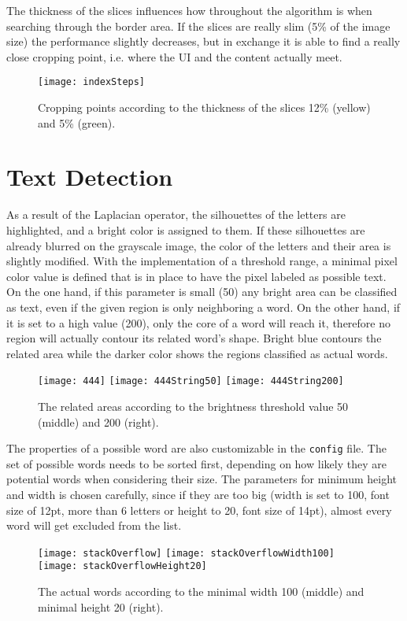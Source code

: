 \documentclass[draft,final]{vutinfth} %
\begin{document}
	The thickness of the slices influences how throughout the algorithm is when searching through the border area.
	If the slices are really slim (5\% of the image size) the performance slightly decreases, but in exchange it is able to find a really close cropping point, i.e. where the UI and the content actually meet.\par
	\begin{figure}[H]
		\centering
		\texttt{[image: indexSteps]}
		\caption{Cropping points according to the thickness of the slices 12\% (yellow) and 5\% (green).}
		\label{fig:res:steps}
	\end{figure}
	\section{Text Detection}
	As a result of the Laplacian operator, the silhouettes of the letters are highlighted, and a bright color is assigned to them. 
	If these silhouettes are already blurred on the grayscale image, the color of the letters and their area is slightly modified. 
	With the implementation of a threshold range, a minimal pixel color value is defined that is in place to have the pixel labeled as possible text.
	On the one hand, if this parameter is small (50) any bright area can be classified as text, even if the given region is only neighboring a word.
	On the other hand, if it is set to a high value (200), only the core of a word will reach it, therefore no region will actually contour its related word's shape.
	Bright blue contours the related area while the darker color shows the regions classified as actual words.\par
	\begin{figure}[H]
		\texttt{[image: 444]}\hfill
		\texttt{[image: 444String50]}\hfill
		\texttt{[image: 444String200]}
		\caption{The related areas according to the brightness threshold value 50 (middle) and 200 (right). }
	\end{figure} 
	The properties of a possible word are also customizable in the \texttt{config} file.
	The set of possible words needs to be sorted first, depending on how likely they are potential words when considering their size.
	The parameters for minimum height and width is chosen carefully, since if they are too big (width is set to 100, font size of 12pt, more than 6 letters or height to 20, font size of 14pt), almost every word will get excluded from the list.
	\begin{figure}[H]
		\texttt{[image: stackOverflow]}\hfill
		\texttt{[image: stackOverflowWidth100]}\hfill
		\texttt{[image: stackOverflowHeight20]}
		\caption{The actual words according to the minimal width 100 (middle) and minimal height 20 (right). }
	\end{figure}  
\end{document}
